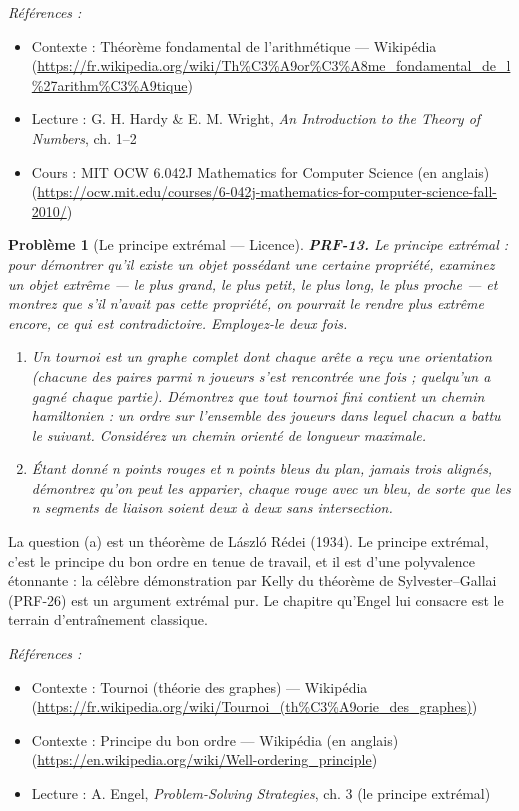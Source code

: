 \documentclass[11pt]{article}
\newtheorem{problem}{Problème}
\newenvironment{refs}{\par\small\noindent\emph{Références :}\begin{itemize}\setlength\itemsep{0pt}}{\end{itemize}\normalsize}
\begin{document}
\begin{refs}
\item Contexte : Théorème fondamental de l'arithmétique --- Wikipédia (\url{https://fr.wikipedia.org/wiki/Th%C3%A9or%C3%A8me_fondamental_de_l%27arithm%C3%A9tique})
\item Lecture : G. H. Hardy \& E. M. Wright, \textit{An Introduction to the Theory of Numbers}, ch. 1--2
\item Cours : MIT OCW 6.042J Mathematics for Computer Science (en anglais) (\url{https://ocw.mit.edu/courses/6-042j-mathematics-for-computer-science-fall-2010/})
\end{refs}

\bigskip

\begin{problem}[{Le principe extrémal --- Licence}]
\textbf{PRF-13.} Le principe extrémal : pour démontrer qu'il existe un objet possédant
une certaine propriété, examinez un objet extrême --- le plus grand, le plus petit, le plus
long, le plus proche --- et montrez que s'il n'avait pas cette propriété, on pourrait le
rendre plus extrême encore, ce qui est contradictoire. Employez-le deux fois.
\begin{enumerate}
\item[(a)] Un tournoi est un graphe complet dont chaque arête a reçu une orientation (chacune des
paires parmi n joueurs s'est rencontrée une fois ; quelqu'un a gagné chaque partie).
Démontrez que tout tournoi fini contient un chemin hamiltonien : un ordre sur l'ensemble
des joueurs dans lequel chacun a battu le suivant. Considérez un chemin orienté de longueur
maximale.
\item[(b)] Étant donné n points rouges et n points bleus du plan, jamais trois alignés, démontrez
qu'on peut les apparier, chaque rouge avec un bleu, de sorte que les n segments de liaison
soient deux à deux sans intersection.
\end{enumerate}

\end{problem}

\noindent La question (a) est un théorème de László Rédei (1934). Le principe
extrémal, c'est le principe du bon ordre en tenue de travail, et il est d'une polyvalence
étonnante : la célèbre démonstration par Kelly du théorème de Sylvester--Gallai (PRF-26) est
un argument extrémal pur. Le chapitre qu'Engel lui consacre est le terrain d'entraînement
classique.

\begin{refs}
\item Contexte : Tournoi (théorie des graphes) --- Wikipédia (\url{https://fr.wikipedia.org/wiki/Tournoi_(th%C3%A9orie_des_graphes)})
\item Contexte : Principe du bon ordre --- Wikipédia (en anglais) (\url{https://en.wikipedia.org/wiki/Well-ordering_principle})
\item Lecture : A. Engel, \textit{Problem-Solving Strategies}, ch. 3 (le principe extrémal)
\end{refs}
\end{document}
